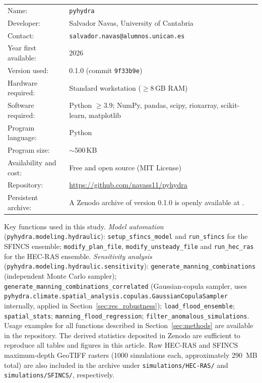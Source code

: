 \documentclass[a4paper,fleqn]{cas-sc}
\newcommand{\sfincs}{\textsc{SFINCS}}
\newcommand{\hecras}{\textsc{HEC-RAS}}
\begin{document}
\smallskip
\begin{tabular}{@{}p{4.5cm}p{9cm}@{}}
Name:                  & \texttt{pyhydra} \\
Developer:             & Salvador Navas, University of Cantabria \\
Contact:               & \texttt{salvador.navas@alumnos.unican.es} \\
Year first available:  & 2026 \\
Version used:          & 0.1.0 (commit \texttt{9f33b9e}) \\
Hardware required:     & Standard workstation ($\geq$8\,GB RAM) \\
Software required:     & Python $\geq$3.9; NumPy, pandas, scipy, rioxarray,
                         scikit-learn, matplotlib \\
Program language:      & Python \\
Program size:          & $\sim$500\,KB \\
Availability and cost: & Free and open source (MIT License) \\
Repository:            & \url{https://github.com/navass11/pyhydra} \\
Persistent archive:    & A Zenodo archive of version 0.1.0 is openly available
                         at \citealp{navas2026zenodo}. \\
\end{tabular}

\smallskip
\begin{sloppypar}
Key functions used in this study.
\textit{Model automation} (\texttt{pyhydra.modeling.hydraulic}):
\texttt{setup\_sfincs\_model} and \texttt{run\_sfincs} for the \sfincs{}
ensemble; \texttt{modify\_plan\_file}, \texttt{modify\_unsteady\_file} and
\texttt{run\_hec\_ras} for the \hecras{} ensemble.
\textit{Sensitivity analysis} (\texttt{pyhydra.modeling.hydraulic.sensitivity}):
\texttt{generate\_manning\_combinations} (independent Monte Carlo sampler);
\texttt{generate\_manning\_combinations\_correlated} (Gaussian-copula sampler,
uses \texttt{pyhydra.climate.spatial\_analysis.copulas.GaussianCopulaSampler}
internally, applied in Section~\ref{sec:res_robustness});
\texttt{load\_flood\_ensemble};
\texttt{spatial\_stats};
\texttt{manning\_flood\_regression};
\texttt{filter\_anomalous\_simulations}.
Usage examples for all functions described in Section~\ref{sec:methods} are
available in the repository.
The derived statistics deposited in Zenodo are sufficient to reproduce all
tables and figures in this article. Raw \hecras{} and \sfincs{} maximum-depth
GeoTIFF rasters (\num{1000} simulations each, approximately 290~MB total) are
also included in the archive under \texttt{simulations/HEC-RAS/} and
\texttt{simulations/SFINCS/}, respectively.
\end{sloppypar}
\end{document}
